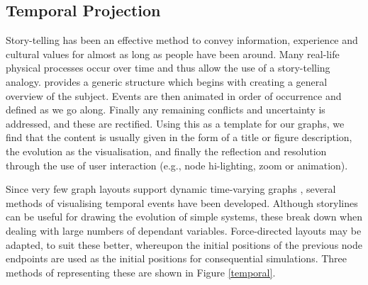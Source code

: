 \subsection{Temporal Projection}
Story-telling has been an effective method to convey information, experience and cultural values for almost as long as people have been around. Many real-life physical processes occur over time and thus allow the use of a story-telling analogy. \cite{storytelling} provides a generic structure which begins with creating a general overview of the subject. Events are then animated in order of occurrence and defined as we go along. Finally any remaining conflicts and uncertainty is addressed, and these are rectified.  
Using this as a template for our graphs, we find that the content is usually given in the form of a title or figure description, the evolution as the visualisation, and finally the reflection and resolution through the use of user interaction (e.g., node hi-lighting, zoom or animation).

Since very few graph layouts support dynamic time-varying graphs \cite{tvg}, several methods of visualising temporal events have been developed. 
Although storylines can be useful for drawing the evolution of simple systems, these break down when dealing with large numbers of dependant variables. Force-directed layouts may be adapted, to suit these better, whereupon the initial positions of the previous node endpoints are used as the initial positions for consequential simulations. Three methods of representing these are shown in Figure \ref{temporal}.


